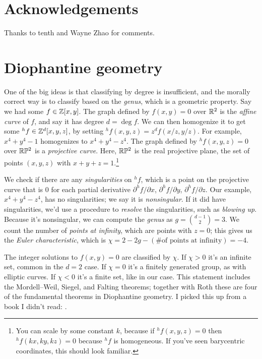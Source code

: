 \documentclass[11pt,paper=letter]{scrartcl}
\begin{document}
\pagebreak
{}
\printbibliography[prenote=prenote]

\section*{Acknowledgements}

Thanks to tenth and Wayne Zhao for comments.

\appendix

\section{Diophantine geometry}
\label{sec:dioph}

One of the big ideas is that classifying by degree is insufficient, and the morally correct way is to classify based on the \textit{genus}, which is a geometric property. Say we had some $f \in \mathbb Z[x, y]$. The graph defined by $f(x, y) = 0$ over $\mathbb R^2$ is the \textit{affine curve} of $f$, and say it has degree $d = \deg f$. We can then homogenize it to get some $^hf \in \mathbb Z^{d}[x, y, z]$, by setting $^hf(x, y, z) = z^{d}f(x/z, y/z)$. For example, $x^4 + y^4 - 1$ homogenizes to $x^4 + y^4 - z^4$. The graph defined by $^hf(x, y, z) = 0$ over $\mathbb R\mathbb P^2$ is a \textit{projective curve}. Here, $\mathbb R\mathbb P^2$ is the real projective plane, the set of points $(x, y, z)$ with $x + y + z = 1$.\footnote{You can scale by some constant $k$, because if $^hf(x, y, z) = 0$ then $^hf(kx, ky, kz) = 0$ because $^hf$ is homogeneous. If you've seen barycentric coordinates, this should look familiar.}

We check if there are any \textit{singularities} on $^hf$, which is a point on the projective curve that is $0$ for each partial derivative $\partial^hf/\partial x$, $\partial ^hf/\partial y$, $\partial ^hf/\partial z$. Our example, $x^4 + y^4 - z^4$, has no singularities; we say it is \textit{nonsingular}. If it did have singularities, we'd use a procedure to \textit{resolve} the singularities, such as \textit{blowing up}. Because it's nonsingular, we can compute the \textit{genus} as $g = \binom{d-1}{2} = 3$. We count the number of \textit{points at infinity}, which are points with $z = 0$; this gives us the \textit{Euler characteristic}, which is $\chi = 2 - 2g - (\text{\# of points at infinity}) = -4$.

The integer solutions to $f(x, y) = 0$ are classified by $\chi$. If $\chi > 0$ it's an infinite set, common in the $d = 2$ case. If $\chi = 0$ it's a finitely generated group, as with elliptic curves. If $\chi < 0$ it's a finite set, like in our case. This statement includes the Mordell--Weil, Siegel, and Falting theorems; together with Roth these are four of the fundamental theorems in Diophantine geometry. I picked this up from a book I didn't read: \cite{hindry13}.
\end{document}
